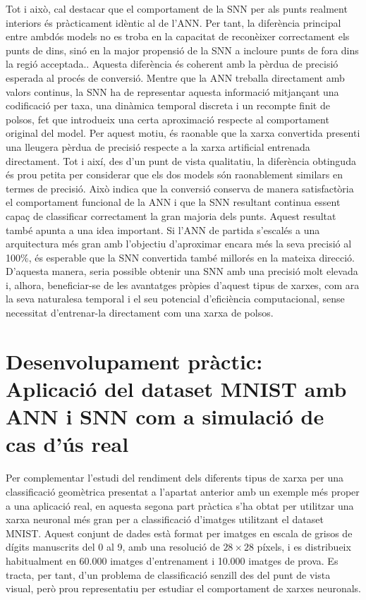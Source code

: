 \documentclass[a4paper,11pt, titlepage, twoside]{article}
\begin{document}
Tot i això, cal destacar que el comportament de la SNN per als punts realment interiors és pràcticament idèntic al de l’ANN. Per tant, la diferència principal entre ambdós models no es troba en la capacitat de reconèixer correctament els punts de dins, sinó en la major propensió de la SNN a incloure punts de fora dins la regió acceptada.. Aquesta diferència és coherent amb la pèrdua de precisió esperada al procés de conversió. Mentre que la ANN treballa directament amb valors continus, la SNN ha de representar aquesta informació mitjançant una codificació per taxa, una dinàmica temporal discreta i un recompte finit de polsos, fet que introdueix una certa aproximació respecte al comportament original del model. Per aquest motiu, és raonable que la xarxa convertida presenti una lleugera pèrdua de precisió respecte a la xarxa artificial entrenada directament.
Tot i així, des d'un punt de vista qualitatiu, la diferència obtinguda és prou petita per considerar que els dos models són raonablement similars en termes de precisió. Això indica que la conversió conserva de manera satisfactòria el comportament funcional de la ANN i que la SNN resultant continua essent capaç de classificar correctament la gran majoria dels punts.
Aquest resultat també apunta a una idea important. Si l'ANN de partida s'escalés a una arquitectura més gran amb l'objectiu d'aproximar encara més la seva precisió al 100\%, és esperable que la SNN convertida també millorés en la mateixa direcció. D'aquesta manera, seria possible obtenir una SNN amb una precisió molt elevada i, alhora, beneficiar-se de les avantatges pròpies d'aquest tipus de xarxes, com ara la seva naturalesa temporal i el seu potencial d'eficiència computacional, sense necessitat d'entrenar-la directament com una xarxa de polsos.
\section{Desenvolupament pràctic: Aplicació del dataset MNIST amb ANN i SNN com a simulació de cas d'ús real}

Per complementar l'estudi del rendiment dels diferents tipus de xarxa per una classificació geomètrica presentat a l'apartat anterior amb un exemple més proper a una aplicació real, en aquesta segona part pràctica s'ha obtat per utilitzar una xarxa neuronal més gran per a classificació d'imatges utilitzant el dataset MNIST. Aquest conjunt de dades està format per imatges en escala de grisos de dígits manuscrits del 0 al 9, amb una resolució de $28\times 28$ píxels, i es distribueix habitualment en 60.000 imatges d'entrenament i 10.000 imatges de prova. Es tracta, per tant, d'un problema de classificació senzill des del punt de vista visual, però prou representatiu per estudiar el comportament de xarxes neuronals.
\end{document}
